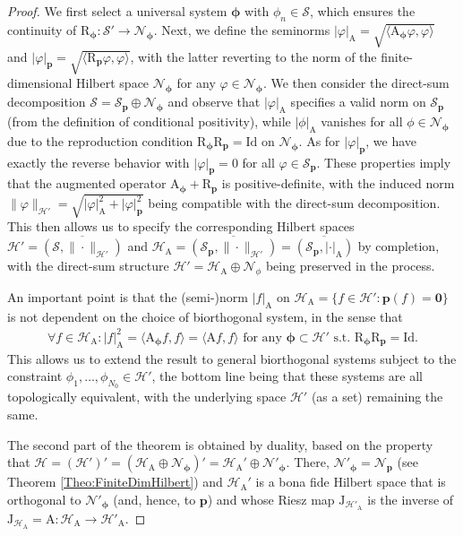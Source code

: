 \documentclass[10pt,a4paper]{amsart}
\def\Identity{\mathrm{Id}} %
\def\Op#1{{\mathrm{#1}}}  %
\def\Spc#1{{\mathcal{#1}}}  %
\def\V#1{{\boldsymbol{#1}}}         %
\begin{document}
\begin{proof}[\small Proof]
{\small
We first select a universal system $\V \phi$ with $\phi_n \in \Spc S$, which ensures the continuity of
$\Op R_{\V \phi}: \Spc S' \to \Spc N_{\V \phi}$. Next, we define the seminorms $|\varphi|_{\Op A}=\sqrt{\langle \Op A_{\V \phi}\varphi,\varphi\rangle}$ and $|\varphi |_{\V p}=\sqrt{\langle \Op R_{\V p}\varphi,\varphi\rangle}$, with the latter reverting to the norm of the finite-dimensional Hilbert space $\Spc N_{\V \phi}$ for any $\varphi \in \Spc N_{\V \phi}$.
We then consider the direct-sum decomposition
$\Spc S=\Spc S_{\V p} \oplus \Spc N_{\V \phi}$ and observe that $|\varphi|_{\Op A}$ specifies a valid norm on
$\Spc S_{\V p}$ (from the definition of conditional positivity), while $|\phi|_{\Op A}$ vanishes for all $\phi \in \Spc N_{\V \phi}$ due to the reproduction condition $\Op R_{\V \phi}\Op R_\V p=\Identity$ on $\Spc N_{\V \phi}$. As for $|\varphi|_{\V p}$, we have exactly the reverse behavior with $|\varphi|_{\V p}=0$ for all $\varphi \in \Spc S_{\V p}$. These properties imply that
the augmented operator $\Op A_{\V \phi} + \Op R_{\V p}$ is positive-definite, with the induced norm
$\|\varphi\|_{\Spc H'}=\sqrt{|\varphi|^2_{\Op A}+|\varphi|^2_{\V p}}$ being compatible with the direct-sum decomposition.
This then allows us to specify the corresponding Hilbert spaces $\Spc H'=\overline{(\Spc S,\|\cdot\|_{\Spc H'})}$ and $\Spc H_{\Op A}=\overline{(\Spc S_{\V p},\|\cdot\|_{\Spc H'})}=\overline{(\Spc S_{\V p},|\cdot|_{\Op A})}$ by completion, with the direct-sum structure $\Spc H'=\Spc H_{\Op A} \oplus \Spc N_{\phi}$ being preserved in the process. 

An important point is that the (semi-)norm $|f|_{\Op A}$ on $\Spc H_{\Op A}=\{f \in \Spc H': \V p(f)=\V 0\}$ is not dependent on the choice of biorthogonal system, in the sense that
\begin{align}
\forall f \in \Spc H_{\Op A}: |f|^2_{\Op A}=\langle \Op A_{\V \phi} f, f\rangle=  \langle \Op A f, f\rangle \mbox{ for any } \V \phi \subset \Spc H' \mbox{ s.t. } \Op R_{\V \phi}\Op R_{\V p}=\Identity.
\end{align}
This allows us to extend the result to general biorthogonal systems subject to the constraint $\phi_1, \dots, \phi_{N_0} \in \Spc H'$, the bottom line being that these systems are all topologically equivalent,
with the underlying space $\Spc H'$ (as a set) remaining the same.

The second part of the theorem is obtained by duality, based on the property that 
$\Spc H=(\Spc H')'=(\Spc H_\Op A \oplus \Spc N_{\V \phi})'=\Spc H_\Op A' \oplus \Spc N'_{\V \phi}$. There, $\Spc N'_{\V \phi}=\Spc N_{\V p}$ (see Theorem \ref{Theo:FiniteDimHilbert}) and $\Spc H_\Op A'$ is a bona fide Hilbert space that is orthogonal to $\Spc N'_{\V \phi}$ (and, hence, to $\V p$) and whose Riesz map  $\Op J_{\Spc H'_\Op A}$ is the inverse of $\Op J_{\Spc H_\Op A}=\Op A: \Spc H_\Op A \to \Spc H'_\Op A$.
} %
\end{proof}
\end{document}
